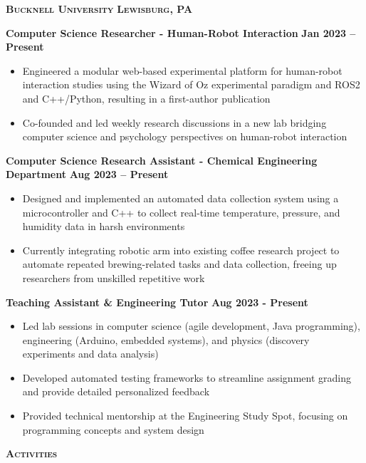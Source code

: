 \documentclass{article}
\newlength{\sectspaceabove}
\newlength{\sectspacebelow}
\newcommand{\textscbf}[1]{\textbf{\textsc{#1}}}
\newcommand{\resumesection}[1]{%
    \vspace{\sectspaceabove}%
    \begin{center}
        \textscbf{#1}
    \end{center}%
    \vspace{\sectspacebelow}%
}
\begin{document}
\textscbf{Bucknell University} \hfill \textscbf{Lewisburg, PA}

\textbf{Computer Science Researcher - Human-Robot Interaction} \hfill \textbf{Jan 2023 – Present}
\begin{itemize}[noitemsep,topsep=2pt]
    \item Engineered a modular web-based experimental platform for human-robot interaction studies using the Wizard of Oz experimental paradigm and ROS2 and C++/Python, resulting in a first-author publication
    \item Co-founded and led weekly research discussions in a new lab bridging computer science and psychology perspectives on human-robot interaction
\end{itemize}

\textbf{Computer Science Research Assistant - Chemical Engineering Department} \hfill \textbf{Aug 2023 – Present}
\begin{itemize}[noitemsep,topsep=2pt]
    \item Designed and implemented an automated data collection system using a microcontroller and C++ to collect real-time temperature, pressure, and humidity data in harsh environments
    \item Currently integrating robotic arm into existing coffee research project to automate repeated brewing-related tasks and data collection, freeing up researchers from unskilled repetitive work
\end{itemize}

\textbf{Teaching Assistant \& Engineering Tutor} \hfill \textbf{Aug 2023 - Present}
\begin{itemize}[noitemsep,topsep=2pt]
    \item Led lab sessions in computer science (agile development, Java programming), engineering (Arduino, embedded systems), and physics (discovery experiments and data analysis)
    \item Developed automated testing frameworks to streamline assignment grading and provide detailed personalized feedback
    \item Provided technical mentorship at the Engineering Study Spot, focusing on programming concepts and system design
\end{itemize}


\resumesection{Activities}

%
\end{document}
